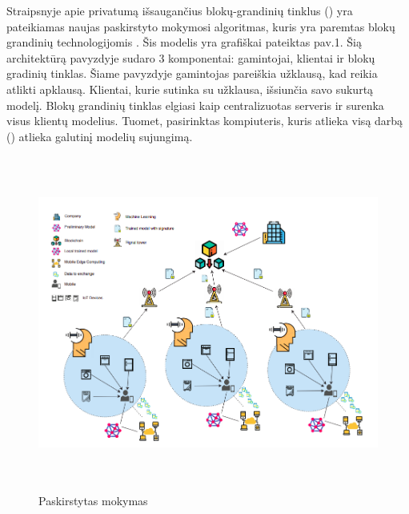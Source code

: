 \documentclass{VUMIFInfBakalaurinis}
\begin{document}
	\par Straipsnyje apie privatumą išsaugančius blokų-grandinių tinklus () yra pateikiamas naujas paskirstyto mokymosi algoritmas, kuris yra paremtas
blokų grandinių technologijomis \cite{5}. Šis modelis yra grafiškai pateiktas pav.1. Šią architektūrą pavyzdyje sudaro 3 komponentai: gamintojai, klientai ir blokų gradinių tinklas. Šiame pavyzdyje gamintojas pareiškia užklausą, kad reikia atlikti apklausą. Klientai, kurie sutinka su užklausa, išsiunčia savo sukurtą modelį. Blokų grandinių tinklas elgiasi kaip centralizuotas serveris ir surenka visus klientų modelius. Tuomet, pasirinktas kompiuteris, kuris atlieka visą darbą () atlieka galutinį modelių sujungimą.


\begin{figure}[ht]
  \centering
  \includegraphics[width=13cm,height=11cm,keepaspectratio]{img/paskirstytasMokymasis.png}
  \caption{Paskirstytas mokymas \cite{5}}
  \label{fig:overflowProblem}
\end{figure}
\end{document}
